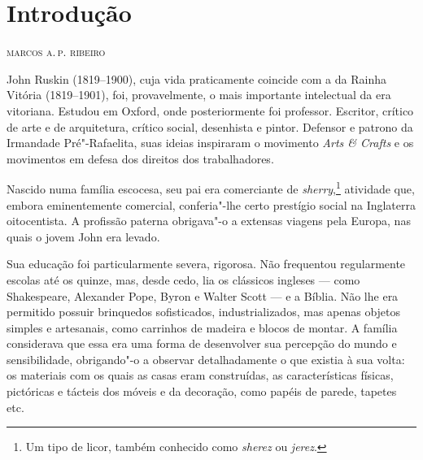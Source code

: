 \pagestyle{plain}

\newcommand{\subtitulo}[1]{\NoCaseChange{\textnormal{\break\Large\itshape#1}}}
\chapter*{Introdução\smallskip\subtitulo{Um testamento literário escrito\\ao longo de 27 anos}}

\begin{flushright}
\textsc{marcos a.\,p. ribeiro}
\end{flushright}\medskip

\noindent{}John Ruskin (1819--1900), cuja vida praticamente coincide com a da Rainha
Vitória (1819--1901), foi, provavelmente, o mais importante intelectual da
era vitoriana. Estudou em Oxford, onde posteriormente foi professor.
Escritor, crítico de arte e de arquitetura, crítico social, desenhista e
pintor. Defensor e patrono da Irmandade Pré"-Rafaelita, suas ideias
inspiraram o movimento \textit{Arts \& Crafts} e os movimentos em defesa
dos direitos dos trabalhadores.

Nascido numa família escocesa, seu pai era comerciante de \textit{sherry},\footnote{Um tipo de licor, também conhecido como \textit{sherez} ou \textit{jerez}.} atividade que, embora eminentemente comercial, conferia"-lhe
certo prestígio social na Inglaterra oitocentista. A profissão paterna
obrigava"-o a extensas viagens pela Europa, nas quais o jovem John era
levado. 

Sua educação foi particularmente severa, rigorosa. Não
frequentou regularmente escolas até os quinze, mas, desde cedo, lia os
clássicos ingleses --- como Shakespeare, Alexander Pope, Byron e Walter Scott --- e
a Bíblia. Não lhe era permitido possuir brinquedos sofisticados,
industrializados, mas apenas objetos simples e artesanais, como
carrinhos de madeira e blocos de montar. A família considerava que essa
era uma forma de desenvolver sua percepção do mundo e sensibilidade,
obrigando"-o a observar detalhadamente o que existia à sua volta: os
materiais com os quais as casas eram construídas, as características
físicas, pictóricas e tácteis dos móveis e da decoração, como papéis de
parede, tapetes etc.



